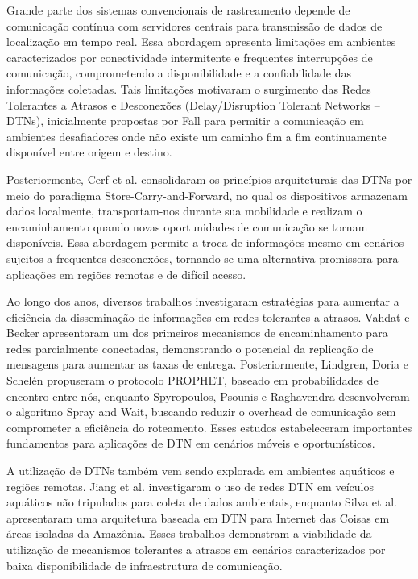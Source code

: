 \documentclass[12pt]{article}
\begin{document}
Grande parte dos sistemas convencionais de rastreamento depende de comunicação contínua com servidores centrais para transmissão de dados de localização em tempo real. Essa abordagem apresenta limitações em ambientes caracterizados por conectividade intermitente e frequentes interrupções de comunicação, comprometendo a disponibilidade e a confiabilidade das informações coletadas. Tais limitações motivaram o surgimento das Redes Tolerantes a Atrasos e Desconexões (Delay/Disruption Tolerant Networks – DTNs), inicialmente propostas por Fall \cite{fall2003dtn} para permitir a comunicação em ambientes desafiadores onde não existe um caminho fim a fim continuamente disponível entre origem e destino.

Posteriormente, Cerf et al. \cite{cerf2007rfc4838} consolidaram os princípios arquiteturais das DTNs por meio do paradigma Store-Carry-and-Forward, no qual os dispositivos armazenam dados localmente, transportam-nos durante sua mobilidade e realizam o encaminhamento quando novas oportunidades de comunicação se tornam disponíveis. Essa abordagem permite a troca de informações mesmo em cenários sujeitos a frequentes desconexões, tornando-se uma alternativa promissora para aplicações em regiões remotas e de difícil acesso.

Ao longo dos anos, diversos trabalhos investigaram estratégias para aumentar a eficiência da disseminação de informações em redes tolerantes a atrasos. Vahdat e Becker \cite{vahdat2000epidemic} apresentaram um dos primeiros mecanismos de encaminhamento para redes parcialmente conectadas, demonstrando o potencial da replicação de mensagens para aumentar as taxas de entrega. Posteriormente, Lindgren, Doria e Schelén \cite{lindgren2003prophet} propuseram o protocolo PROPHET, baseado em probabilidades de encontro entre nós, enquanto Spyropoulos, Psounis e Raghavendra \cite{spyropoulos2005spray} desenvolveram o algoritmo Spray and Wait, buscando reduzir o overhead de comunicação sem comprometer a eficiência do roteamento. Esses estudos estabeleceram importantes fundamentos para aplicações de DTN em cenários móveis e oportunísticos.

A utilização de DTNs também vem sendo explorada em ambientes aquáticos e regiões remotas. Jiang et al. \cite{usvswarm2018} investigaram o uso de redes DTN em veículos aquáticos não tripulados para coleta de dados ambientais, enquanto Silva et al. \cite{floatingblue2024} apresentaram uma arquitetura baseada em DTN para Internet das Coisas em áreas isoladas da Amazônia. Esses trabalhos demonstram a viabilidade da utilização de mecanismos tolerantes a atrasos em cenários caracterizados por baixa disponibilidade de infraestrutura de comunicação.
\end{document}
